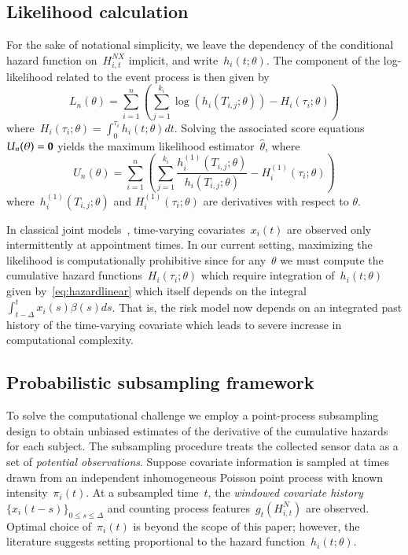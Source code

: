 \documentclass[11pt]{amsart}
\begin{document}
\subsection{Likelihood calculation}  

For the sake of notational simplicity, we leave the dependency of the
conditional hazard function on~$H_{i,t}^{NX}$ implicit, and write~$h_i
(t; \theta)$. The component of the log-likelihood related to the event
process is then given by
\[
  L_n (\theta) = \sum_{i=1}^{n} \left ( \sum_{j=1}^{k_i} 
    \log \left( h_i \left( T_{i,j}; \theta
      \right) \right) - H_{i} \left( \tau_i; \theta \right) \right) 
\]
where~$H_{i} (\tau_i ; \theta) = \int_{0}^{\tau_i} h_{i} (t; \theta)
dt$. Solving the associated score equations~$U_n (\theta) = {\bf 0}$
yields the maximum likelihood estimator~$\hat \theta$, where
\[
U_n (\theta) = \sum_{i=1}^{n} \left ( \sum_{j=1}^{k_i} \frac{h^{(1)}_i
    (T_{i,j}; \theta)}{h_i (T_{i,j}; \theta)} - H^{(1)}_{i} (\tau_i;
  \theta) \right)  
\]
where~$h_i^{(1)} (T_{i,j}; \theta)$ and $H_i^{(1)} (\tau_{i}; \theta)$
are derivatives with respect to $\theta$.

In classical joint models~\citep{Henderson2000, Tsiatis2004},
time-varying covariates~$x_i (t)$ are observed only intermittently at
appointment times. In our current setting, maximizing the likelihood
is computationally prohibitive since for any~$\theta$ we must compute
the cumulative hazard functions~$H_{i} (\tau_i; \theta)$ which require
integration of~$h_i(t;\theta)$ given by~\eqref{eq:hazardlinear} which
itself depends on the integral~$\int_{t-\Delta}^t x_i (s) \beta(s)
ds$.  That is, the risk model now depends on an integrated past
history of the time-varying covariate which leads to severe increase
in computational complexity. 

\subsection{Probabilistic subsampling framework}

To solve the computational challenge we employ a point-process
subsampling design to obtain unbiased estimates of the derivative of
the cumulative hazards for each subject. The subsampling procedure
treats the collected sensor data as a set of \emph{potential
  observations}. Suppose covariate information is sampled at times
drawn from an independent inhomogeneous Poisson point process with
known intensity~$\pi_i (t)$. At a subsampled time~$t$, the
\emph{windowed covariate history} $\{ x_i (t-s)\}_{0 \leq s \leq
  \Delta}$ and counting process features~$g_t (H_{i,t}^N)$ are
observed. Optimal choice of~$\pi_i (t)$ is beyond the scope of this
paper; however, the literature suggests setting proportional to the
hazard function~$h_i (t; \theta)$. 
\end{document}
